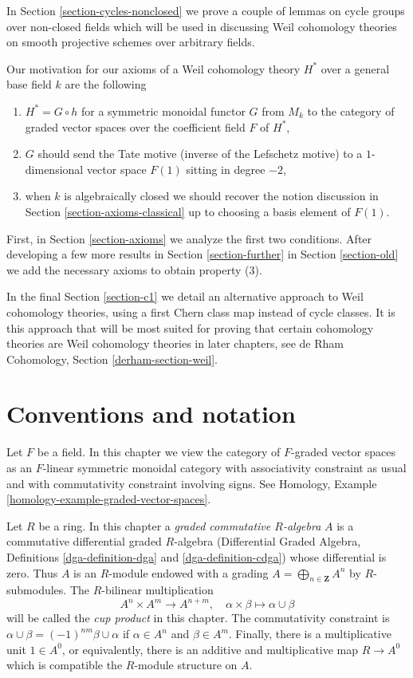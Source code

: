 \medskip\noindent
In Section \ref{section-cycles-nonclosed} we prove a couple of lemmas
on cycle groups over non-closed fields which will be used in discussing
Weil cohomology theories on smooth projective schemes over arbitrary fields.

\medskip\noindent
Our motivation for our axioms of a Weil cohomology theory $H^*$
over a general base field $k$ are the following
\begin{enumerate}
\item $H^* = G \circ h$ for a symmetric monoidal functor $G$ from $M_k$
to the category of graded vector spaces over the coefficient field $F$ of $H^*$,
\item $G$ should send the Tate motive (inverse of the Lefschetz motive)
to a $1$-dimensional vector space $F(1)$ sitting in degree $-2$,
\item when $k$ is algebraically closed we should recover the notion
discussion in Section \ref{section-axioms-classical}
up to choosing a basis element of $F(1)$.
\end{enumerate}
First, in Section \ref{section-axioms} we analyze the first two conditions.
After developing a few more results in Section \ref{section-further}
in Section \ref{section-old} we add the necessary axioms to obtain
property (3).

\medskip\noindent
In the final Section \ref{section-c1} we detail an alternative approach
to Weil cohomology theories, using a first Chern class map
instead of cycle classes. It is this approach that will be most
suited for proving that certain cohomology theories are Weil cohomology
theories in later chapters, see
de Rham Cohomology, Section \ref{derham-section-weil}.





\section{Conventions and notation}
\label{section-conventions}

\noindent
Let $F$ be a field. In this chapter we view the category of $F$-graded vector
spaces as an $F$-linear symmetric monoidal category with associativity
constraint as usual and with commutativity constraint involving signs.
See Homology, Example \ref{homology-example-graded-vector-spaces}.

\medskip\noindent
Let $R$ be a ring. In this chapter a
{\it graded commutative $R$-algebra} $A$ is a
commutative differential graded $R$-algebra
(Differential Graded Algebra, Definitions \ref{dga-definition-dga} and
\ref{dga-definition-cdga}) whose differential is zero. Thus $A$
is an $R$-module endowed with a grading
$A = \bigoplus_{n \in \mathbf{Z}} A^n$ by
$R$-submodules. The $R$-bilinear multiplication
$$
A^n \times A^m \longrightarrow A^{n + m},\quad
\alpha \times \beta \longmapsto \alpha \cup \beta
$$
will be called the {\it cup product} in this chapter.
The commutativity constraint is
$\alpha \cup \beta = (-1)^{nm} \beta \cup \alpha$ if
$\alpha \in A^n$ and $\beta \in A^m$. Finally, there is
a multiplicative unit $1 \in A^0$, or equivalently, there is an
additive and multiplicative map $R \to A^0$ which is compatible the
$R$-module structure on $A$.

